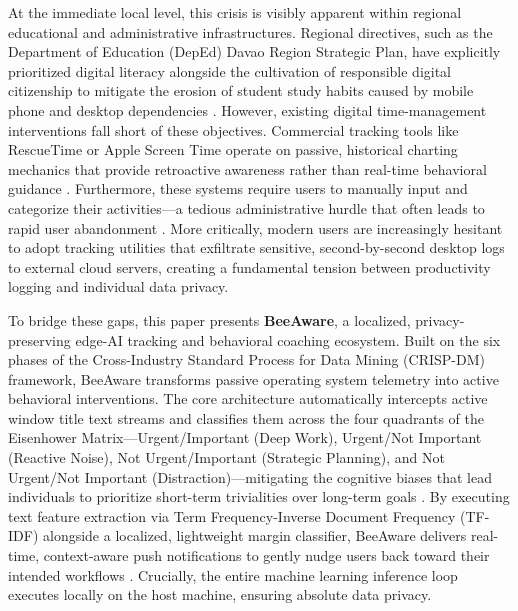 \documentclass[conference]{IEEEtran}
\begin{document}
At the immediate local level, this crisis is visibly apparent within regional educational and administrative infrastructures. Regional directives, such as the Department of Education (DepEd) Davao Region Strategic Plan, have explicitly prioritized digital literacy alongside the cultivation of responsible digital citizenship to mitigate the erosion of student study habits caused by mobile phone and desktop dependencies \cite{DepEdDavao2025, Geranco2026}. However, existing digital time-management interventions fall short of these objectives. Commercial tracking tools like RescueTime or Apple Screen Time operate on passive, historical charting mechanics that provide retroactive awareness rather than real-time behavioral guidance \cite{Abhari2022}. Furthermore, these systems require users to manually input and categorize their activities—a tedious administrative hurdle that often leads to rapid user abandonment \cite{Lally2013}. More critically, modern users are increasingly hesitant to adopt tracking utilities that exfiltrate sensitive, second-by-second desktop logs to external cloud servers, creating a fundamental tension between productivity logging and individual data privacy.

To bridge these gaps, this paper presents \textbf{BeeAware}, a localized, privacy-preserving edge-AI tracking and behavioral coaching ecosystem. Built on the six phases of the Cross-Industry Standard Process for Data Mining (CRISP-DM) framework, BeeAware transforms passive operating system telemetry into active behavioral interventions. The core architecture automatically intercepts active window title text streams and classifies them across the four quadrants of the Eisenhower Matrix—Urgent/Important (Deep Work), Urgent/Not Important (Reactive Noise), Not Urgent/Important (Strategic Planning), and Not Urgent/Not Important (Distraction)—mitigating the cognitive biases that lead individuals to prioritize short-term trivialities over long-term goals \cite{Covey1989, Zhu2018}. By executing text feature extraction via Term Frequency-Inverse Document Frequency (TF-IDF) alongside a localized, lightweight margin classifier, BeeAware delivers real-time, context-aware push notifications to gently nudge users back toward their intended workflows \cite{Thaler2021, Fogg2009}. Crucially, the entire machine learning inference loop executes locally on the host machine, ensuring absolute data privacy.
\end{document}
